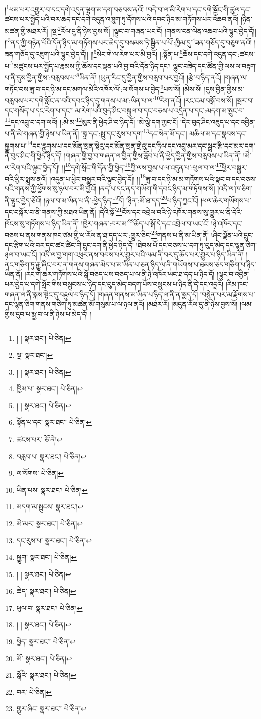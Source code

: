 །\footnote{། །  སྣར་ཐང་།  པེ་ཅིན། }ཕམ་པར་འགྱུར་བ་དང་དགེ་འདུན་ལྷག་མ་དག་བཅབས་ནའོ། །བདེ་བ་ལ་མི་རེག་པ་དང་དགེ་སྦྱོང་གི་ཚུལ་དང་ཚངས་པར་སྤྱོད་པའི་བར་ཆད་དང་དགེ་འདུན་འཁྲུག་ཏུ་དོགས་པའི་དབང་ཉིད་མ་གཏོགས་པར་འཆབ་ནའོ། །ཉིན་མཚན་གྱི་མཐར་རོ། །སྔ་\footnote{ལྔ་  སྣར་ཐང་། }རོལ་དུ་ནི་ཉེས་བྱས་སོ། །ལྟུང་བ་གཞན་ཡང་ངོ། །གནས་ངན་ལེན་འཆབ་པའི་ལྟུང་བྱེད་དོ།། །།\footnote{། །  སྣར་ཐང་།  པེ་ཅིན། }ནད་ཀྱི་གཉེན་པོའི་དོན་ཉིད་མ་གཏོགས་པར་ཆེད་དུ་བསམས་ཏེ་སྦྱིན་པ་པོ་:ཁྱིམ་དུ་\footnote{ཁྱིམ་པ་  སྣར་ཐང་།  པེ་ཅིན། }ཟན་གཅོད་དུ་བཅུག་ནའོ། །ཟན་གཅོད་དུ་འཇུག་པའི་ལྟུང་བྱེད་དོ།། །།\footnote{། །  སྣར་ཐང་།  པེ་ཅིན། }སེང་གེ་ལ་རེག་པར་མི་བྱའོ། །:སྟོན་པ་\footnote{སྟོན་པ་དང་  སྣར་ཐང་།  པེ་ཅིན། }ཆོས་དང་དགེ་འདུན་དང་:ཚངས་པ་\footnote{ཚངས་པར་  ཅོ་ནེ། }མཚུངས་པར་སྤྱོད་པ་རྣམས་ཀྱི་ཆོས་དང་ལྡན་པའི་བྱ་བའི་དོན་ཉིད་དང་། ལྷུང་བཟེད་དང་ཚོན་གྱི་ལས་ལ་བརྟག་པ་ནི་དུས་བྱིན་གྱིས་:བརླབས་པ་\footnote{བརླབ་པ་  སྣར་ཐང་།  པེ་ཅིན། }ཡིན་ནོ། །ཡུན་རིང་དུ་བྱིན་གྱིས་བརླབ་པར་བྱའོ། །རྩེ་བ་ཉིད་ནའོ། །གཞན་ལ་གཏོང་བས་ཟླ་བ་དང་ཉི་མ་དང་མགལ་མེའི་འཁོར་ལོ་:ལ་སོགས་པ་བྱེད་\footnote{ལ་སོགས་  པེ་ཅིན། }པས་སོ། །མེས་སོ། །དུས་བྱིན་གྱིས་མ་བརླབས་པར་དགེ་སློང་ན་བའི་དབང་ཉིད་དུ་གནས་པ་མ་:ཡིན་པ་ལ་\footnote{ཡིན་པས་  སྣར་ཐང་།  པེ་ཅིན། }རེག་ནའོ། །རང་ངམ་བསྒོ་བས་སོ། །སྦར་བ་དང་གསོད་པ་དང་རེག་པ་དང་། མ་རེག་པའི་བུད་ཤིང་བསྐུལ་བ་དང་བཅས་པ་འདྲེན་པ་དང་:མདག་མ་སྤུང་བ་\footnote{མདག་མ་སྤུངས་  སྣར་ཐང་། }དང་འབྲུ་བ་དག་ལའོ། །:མེ་མ་\footnote{མེ་མར་  སྣར་ཐང་།  པེ་ཅིན། }མུར་ནི་ཕྱེད་ཤི་བ་ཉིད་དོ། །མེ་ལྕེ་དག་ཀྱང་ངོ། །དེར་བུད་ཤིང་འཇུད་པ་དང་འབྱིན་པ་ནི་མེ་གཞན་གྱི་ཉེས་པ་ཡིན་ནོ། །སྐྲ་དང་:སྤུ་དང་རུས་པ་དག་\footnote{དང་རུས་པ་  སྣར་ཐང་།  པེ་ཅིན། }དང་སེན་མོ་དང་། མཆིལ་མ་དང་སྣབས་དང་སྐྱུགས་པ་\footnote{སྐྱུག་  སྣར་ཐང་།  པེ་ཅིན། }དང་རླུགས་པ་དང་མོན་སྲན་སྡེའུ་དང་མོན་སྲན་གྲེའུ་དང་ཏིལ་དང་འབྲུ་མར་དང་སྦྲང་རྩི་དང་མར་དག་ནི་བུད་ཤིང་གི་ཕྱེད་ཉིད་དོ། །གཞན་གྱི་བྱ་བ་གཞན་ལ་བྱིན་གྱིས་རློབ་པ་ནི་ཕྱེད་བྱིན་གྱིས་བརླབས་པ་ཡིན་ནོ། །མེ་ལ་རེག་པའི་ལྟུང་བྱེད་དོ།། །།\footnote{། །  སྣར་ཐང་།  པེ་ཅིན། }དགེ་སློང་གི་དོན་གྱི་ཕྱེད་\footnote{ཆེད་  སྣར་ཐང་།  པེ་ཅིན། }ཀྱི་ལས་བྱས་པ་ལ་འདུན་པ་:ཕུལ་བ་ལ་\footnote{ཕུལ་བ་  སྣར་ཐང་།  པེ་ཅིན། }ཕྱིར་བསྒྱུར་བའི་ཕྱིར་སྨྲས་ནའོ། །འདུན་པ་ཕྱིར་བསྒྱུར་བའི་ལྟུང་བྱེད་དོ།། །།\footnote{། །  སྣར་ཐང་།  པེ་ཅིན། }ཟླ་བ་དང་ཉི་མ་མ་གཏོགས་པའི་སྣང་བ་དང་བཅས་པའི་གནས་ཀྱི་ཕྱོགས་སུ་ཉལ་བར་མི་བྱའོ། །ནད་པ་དང་ནད་གཡོག་གི་དབང་ཉིད་མ་གཏོགས་སོ། །འདི་ལ་ཁ་ཅིག་ནི་ལྟུང་བྱེད་ཅེའོ། །ཉལ་བ་མ་ཡིན་པ་ནི་:ཕྱེད་ཉིད་\footnote{ཕྱེད་  སྣར་ཐང་།  པེ་ཅིན། }དོ། །ཉིན་:མོ་ཐ་དད་\footnote{མོ་  སྣར་ཐང་།  པེ་ཅིན། }པ་ཉིད་ཀྱང་ངོ། །ཕལ་ཆེར་གཡོགས་པ་དང་བསྐོར་བ་ནི་གནས་ཀྱི་མཐའ་ཡིན་ནོ། །དེའི་སྒོ་\footnote{སྒོའི་  སྣར་ཐང་།  པེ་ཅིན། }ངོས་དང་འབྲེལ་བའི་ཉེ་འཁོར་གནས་སུ་གྱུར་པ་ནི་དེའི་ཁོངས་སུ་གཏོགས་པ་ཉིད་ཡིན་ནོ། །ཁྱེར་གཞན་:བར་མ་\footnote{བར་  པེ་ཅིན། }ཆོད་པ་སྒོ་དེ་དང་འབྲེལ་བ་ཡང་ངོ། །ཉེ་འཁོར་དང་བཅས་པ་ནས་གནས་ཁང་ཙམ་གྱི་ཕ་རོལ་ན་ཐ་དད་པར་:གྱུར་ཅིང་\footnote{གྱུར་ཞིང་  སྣར་ཐང་།  པེ་ཅིན། }གནས་པ་ནི་མ་ཡིན་ནོ། །ཤིང་ལྗོན་པའི་དྲུང་དང་རྩིག་པའི་བར་དང་ཚང་ཚིང་གི་དྲུང་དག་ནི་ཕྱེད་ཉིད་དོ། །ཐིབས་པོ་དང་བཅས་པ་དག་ཏུ་བུད་མེད་དང་ལྷན་ཅིག་ཉལ་བ་ཡང་ངོ། །འདི་ལ་བྱ་གག་འཕུར་ནས་བབས་པར་གྱུར་པའི་ལམ་ནི་བར་དུ་ཆོད་པར་གྱུར་པ་ཉིད་ཡིན་ནོ། །ནང་གཅིག་ཏུ་རྒྱུ་ཞིང་བར་ན་གནས་གཞན་མེད་པ་མ་ཡིན་པ་ཅན་ཉིད་ལ་ནི་གཡོགས་པ་ཐམས་ཅད་གཅིག་པ་ཉིད་ཡིན་ནོ། །རང་གི་ཆར་གཏོགས་པའི་སྒོ་བཅད་པས་བཅད་པ་ལ་ནི་ཉེ་འཁོར་ཡང་ཐ་དད་པ་ཉིད་དོ། །ལྟུང་བ་འབྱིན་པར་བྱེད་པ་དགེ་སློང་གིས་བསྲུངས་པ་ཉིད་དང་བུད་མེད་བདག་པོས་བསྲུངས་པ་ཉིད་ནི་དེ་དང་འདྲའོ། །རིམ་ཁང་གཞན་ལ་ནི་སྐས་སྟེང་དུ་བརྟུལ་བ་ཉིད་དོ། །གཞན་གནས་མ་ཡིན་པ་ཉིད་ལ་ནི་ན་སྨད་དོ། །བསྙེན་པར་མ་རྫོགས་པ་དང་ལྷན་ཅིག་གནས་གཅིག་ཏུ་མཚན་མོ་གསུམ་པ་ལ་ཉལ་ནའོ། །མཐར་རོ། །མདུན་རོལ་དུ་ནི་ཉེས་བྱས་སོ། །ལམ་གྱིས་དུབ་པ་རྨྱ་བ་ལ་ནི་ཉེས་པ་མེད་དོ། །
